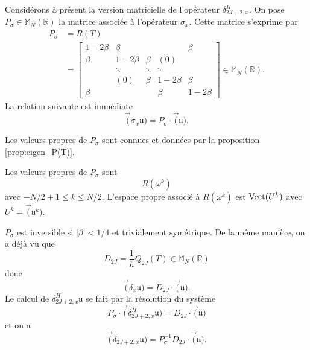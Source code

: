 Considérons à présent la version matricielle de l'opérateur $\delta_{2J+2,x}^H$. On pose $P_{\sigma} \in \mathbb{M}_N(\mathbb{R})$ la matrice associée à l'opérateur $\sigma_x$. Cette matrice s'exprime par
\begin{align}
P_{\sigma} & = R(T) \\
  & = \begin{bmatrix}
  1 - 2 \beta & \beta &   &   & \beta \\ 
  \beta & 1 - 2 \beta & \beta & (0) &   \\ 
    & \ddots & \ddots & \ddots &   \\ 
    & (0) & \beta & 1 - 2 \beta & \beta \\ 
  \beta &   &   & \beta & 1 - 2 \beta
  \end{bmatrix} \in \mathbb{M}_{N}(\mathbb{R}).
\label{eq:matrice_implicitpart}
\end{align}
La relation suivante est immédiate
\begin{equation}
\vec (\sigma_x \mathfrak{u}) = P_{\sigma} \cdot \vec (\mathfrak{u}).
\end{equation}

Les valeurs propres de $P_{\sigma}$ sont connues et données par la proposition \ref{prop:eigen_P(T)}.
\begin{proposition}
Les valeurs propres de $P_{\sigma}$ sont 
\begin{equation}
R(\omega^k)
\end{equation}
avec $-N/2+1 \leq k \leq N/2$. L'espace propre associé à $R(\omega^k)$ est $\text{Vect}(U^k)$ avec $U^k = \vec( \mathfrak{u}^k )$.
\end{proposition}

$P_{\sigma}$ est inversible si $|\beta |<1/4$ et trivialement symétrique. 
De la même manière, on a déjà vu que 
\begin{equation}
D_{2J} = \dfrac{1}{h} Q_{2J}(T) \in \mathbb{M}_{N}(\mathbb{R})
\end{equation}
donc 
\begin{equation}
\vec (\delta_{x} \mathfrak{u}) = D_{2J} \cdot \vec (\mathfrak{u}).
\end{equation}
Le calcul de $\delta^H_{2J+2,x} \mathfrak{u}$ se fait par la résolution du système
\begin{equation}
P_{\sigma} \cdot \vec (\delta_{2J+2,x}^H \mathfrak{u}) = D_{2J} \cdot \vec (\mathfrak{u})
\end{equation}
et on a 
\begin{equation}
\vec (\delta_{2J+2,x} \mathfrak{u} ) =P_{\sigma}^{-1} D_{2J} \cdot \vec (\mathfrak{u}).
\end{equation}

